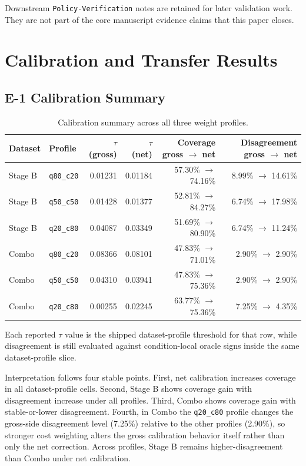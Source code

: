 \documentclass[11pt,a4paper]{article}
\begin{document}
Downstream \texttt{Policy-Verification} notes are retained for later
validation work. They are not part of the core manuscript evidence claims that
this paper closes.

\section{Calibration and Transfer Results}
\label{sec:results}

\subsection{E-1 Calibration Summary}
\label{sec:e1summary}

\begin{table}[ht]
\centering
\small
\begin{tabular}{@{}llrrrr@{}}
\toprule
Dataset & Profile & $\tau$ (gross) & $\tau$ (net) & Coverage gross $\rightarrow$ net & Disagreement gross $\rightarrow$ net \\
\midrule
Stage B & \texttt{q80\_c20} & 0.01231 & 0.01184 & 57.30\% $\rightarrow$ 74.16\% & 8.99\% $\rightarrow$ 14.61\% \\
Stage B & \texttt{q50\_c50} & 0.01428 & 0.01377 & 52.81\% $\rightarrow$ 84.27\% & 6.74\% $\rightarrow$ 17.98\% \\
Stage B & \texttt{q20\_c80} & 0.04087 & 0.03349 & 51.69\% $\rightarrow$ 80.90\% & 6.74\% $\rightarrow$ 11.24\% \\
Combo & \texttt{q80\_c20} & 0.08366 & 0.08101 & 47.83\% $\rightarrow$ 71.01\% & 2.90\% $\rightarrow$ 2.90\% \\
Combo & \texttt{q50\_c50} & 0.04310 & 0.03941 & 47.83\% $\rightarrow$ 75.36\% & 2.90\% $\rightarrow$ 2.90\% \\
Combo & \texttt{q20\_c80} & 0.00255 & 0.02245 & 63.77\% $\rightarrow$ 75.36\% & 7.25\% $\rightarrow$ 4.35\% \\
\bottomrule
\end{tabular}
\caption{Calibration summary across all three weight profiles.}
\label{tab:e1_summary}
\end{table}

Each reported $\tau$ value is the shipped dataset-profile threshold for that
row, while disagreement is still evaluated against condition-local oracle
signs inside the same dataset-profile slice.

Interpretation follows four stable points. First, net calibration increases coverage in all dataset-profile cells. Second, Stage B shows coverage gain with disagreement increase under all profiles. Third, Combo shows coverage gain with stable-or-lower disagreement. Fourth, in Combo the \texttt{q20\_c80} profile changes the gross-side disagreement level (7.25\%) relative to the other profiles (2.90\%), so stronger cost weighting alters the gross calibration behavior itself rather than only the net correction. Across profiles, Stage B remains higher-disagreement than Combo under net calibration.
\end{document}
